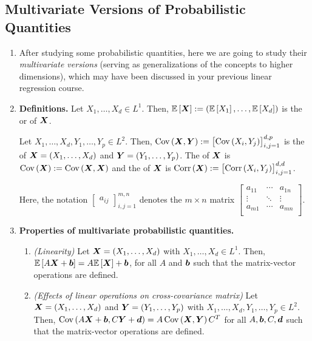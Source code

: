\subsection{Multivariate Versions of Probabilistic Quantities}
\label{subsect:multivar-prob-quant}
\begin{enumerate}
\item After studying some probabilistic quantities, here we are going to study
their \emph{multivariate versions} (serving as generalizations of the concepts
to higher dimensions), which may have been discussed in your previous linear
regression course.
\item \textbf{Definitions.} Let \(X_1,\dotsc,X_d\in L^{1}\). Then,
\(\mathbb{E}\left[\bm{X}\right]:=(\mathbb{E}\left[X_1\right],\dotsc,\mathbb{E}\left[X_d\right])\) is the 
or  of \(\bm{X}\).

Let \(X_1,\dotsc,X_d,Y_1,\dotsc,Y_p\in L^{2}\). Then,
\(\operatorname{Cov}\left(\bm{X},\bm{Y}\right)
:=\begin{bmatrix}\operatorname{Cov}\left(X_i,Y_j\right)\end{bmatrix}_{i,j=1}^{d,p}\) is the
 of \(\bm{X}=(X_1,\dotsc,X_d)\) and
\(\bm{Y}=(Y_1,\dotsc,Y_p)\). The  of \(\bm{X}\) is
\(\operatorname{Cov}\left(\bm{X}\right):=\operatorname{Cov}\left(\bm{X},\bm{X}\right)\) and the  of \(\bm{X}\)
is \(\operatorname{Corr}\left(\bm{X}\right):=\begin{bmatrix}\operatorname{Corr}\left(X_i,Y_j\right)\end{bmatrix}_{i,j=1}^{d,d}\).

\begin{note}
Here, the notation \(\begin{bmatrix}a_{ij}\end{bmatrix}_{i,j=1}^{m,n}\) denotes
the \(m\times n\) matrix \(\begin{bmatrix}
a_{11}&\cdots&a_{1n}\\
\vdots&\ddots&\vdots\\
a_{m1}&\cdots&a_{mn}\\
\end{bmatrix}\).
\end{note}
\item\label{it:mult-var-prob-quant-prop} \textbf{Properties of multivariate
probabilistic quantities.}
\begin{enumerate}
\item\label{it:mean-vec-linearity} \emph{(Linearity)} Let \(\bm{X}=(X_1,\dotsc,X_d)\)
with \(X_1,\dotsc,X_d\in L^{1}\).
Then, \(\mathbb{E}\left[A\bm{X}+\bm{b}\right]=A\mathbb{E}\left[\bm{X}\right]+\bm{b}\), for all \(A\) and
\(\bm{b}\) such that the matrix-vector operations are defined.
\item\label{it:lin-cross-cov} \emph{(Effects of linear operations on cross-covariance matrix)} Let
\(\bm{X}=(X_1,\dotsc,X_d)\) and \(\bm{Y}=(Y_1,\dotsc,Y_p)\) with
\(X_1,\dotsc,X_d,Y_1,\dotsc,Y_p\in L^{2}\). Then,
\(\operatorname{Cov}\left(A\bm{X}+\bm{b},C\bm{Y}+\bm{d}\right)=A\operatorname{Cov}\left(\bm{X},\bm{Y}\right)C^{T}\)
for all \(A,\bm{b},C,\bm{d}\) such that the matrix-vector operations are
defined.


\end{enumerate}
\end{enumerate}

